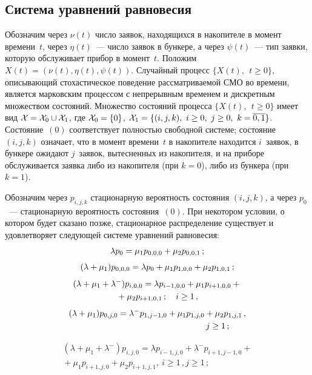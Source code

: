 \begin{multicols}{2}
\section{Система уравнений равновесия}

Обозначим через $\nu(t)$ число заявок, находящихся в накопителе
в момент времени~$t$, через $\eta(t)$~---
число заявок в бункере, а через $\psi(t)$~--- тип заявки,
которую обслуживает прибор в момент~$t$.\linebreak
Положим $X(t)=(\nu(t),\eta(t),\psi(t))$. Случайный процесс
$\{X(t),\ \ t\ge 0\}$, описывающий стохастическое поведение
рассматриваемой СМО во времени, является марковским процессом
с непрерывным временем и дискретным множеством состояний.
Множество состояний процесса $\{X(t), \ \ t\ge 0\}$ имеет вид
$\mathcal{X}\hm= \mathcal{X}_0 \cup \mathcal{X}_1$,
где $\mathcal{X}_0\hm=\{0\}$, 
${\mathcal{X}_1}\hm=\{(i,j,k), \ i \ge 0, \ j \ge 0, \ k=\overline{0,1} \}$.
Состояние~$(0)$ соответствует полностью свободной системе;
состояние~$(i,j,k)$
означает, что в момент времени~$t$ в
накопителе находится $i$~заявок, в бункере ожидают $j$~заявок, вытесненных из накопителя, и на приборе обслуживается
заявка либо из накопителя (при $k=0$), либо из бункера (при $k=1$).

Обозначим через $p_{i,j,k}$ стационарную вероятность состояния $(i,j,k)$, а через $p_0$~--- 
стационарную вероятность состояния~$(0)$.
При некотором условии, о котором будет сказано позже, стационарное распределение
существует и удовлетворяет сле\-ду\-ющей системе уравнений равновесия:
\begin{gather}
\label{e1-r}
\lambda p_0 = \mu_1 p_{0,0,0}+\mu_2 p_{0,0,1}\,;\\[4pt]
\label{e2-r}
(\lambda +\mu_1)p_{0,0,0}=\lambda p_0 + \mu_1 p_{1,0,0} + 
\mu_2 p_{1,0,1}\,;
\\[4pt]
\label{e3-r}
(\lambda +\mu_1+\lambda^-)p_{i,0,0}=\lambda p_{i-1,0,0} + \mu_1 p_{i+1,0,0} +{}\notag\\ 
{}+\mu_2 p_{i+1,0,1}\,; \quad
i \ge 1\,, \\[4pt]
\label{e4-r}
(\lambda+\mu_1)p_{0,j,0}=\lambda^- p_{1,j-1,0} + \mu_1 p_{1,j,0} + \mu_2 p_{1,j,1}\,,\notag\\
\hspace*{50mm}j \ge 1\,;
\end{gather}

\vspace*{-9pt}

\noindent
\begin{multline}
\label{e5-r}
(\lambda+\mu_1+\lambda^-) p_{i,j,0}=\lambda p_{i-1,j,0} +  \lambda^- p_{i+1,j-1,0}  +{}\\
{}+ \mu_1 p_{i+1,j,0} + \mu_2 p_{i+1,j,1},\ i \ge 1\,, j \ge 1\,;
\end{multline}


\end{multicols}
